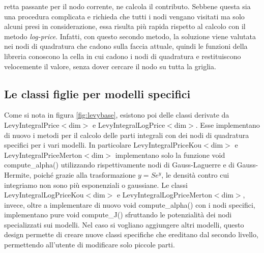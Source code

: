 \documentclass[a4paper,10pt]{report}
\theoremstyle{plain}
\theoremstyle{definition}
\theoremstyle{remark}
\begin{document}
retta passante per il nodo corrente, ne calcola il contributo. Sebbene questa sia una procedura complicata  e richieda che tutti i nodi vengano visitati ma solo alcuni presi in considerazione, essa risulta più rapida rispetto al calcolo con il metodo \emph{log-price}. Infatti, con questo secondo metodo, la soluzione viene valutata nei nodi di quadratura che cadono sulla faccia attuale, quindi le funzioni della libreria conoscono la cella in cui cadono i nodi di quadratura e restituiscono velocemente il valore, senza dover cercare il nodo su tutta la griglia.

\subsection{Le classi figlie per modelli specifici}

Come si nota in figura \ref{fig:levybase}, esistono poi delle classi derivate da \textsf{LevyIntegralPrice$<$dim$>$} e \textsf{LevyIntegralLogPrice$<$dim$>$}. Esse implementano di nuovo i metodi per il calcolo delle parti integrali con dei nodi di quadratura specifici per i vari modelli. In particolare \textsf{LevyIntegralPriceKou$<$dim$>$} e \textsf{LevyIntegralPriceMerton$<$dim$>$} implementano solo la funzione \textsf{void compute\_alpha()} utilizzando rispettivamente nodi di Gauss-Laguerre e di Gauss-Hermite, poich\'e grazie alla trasformazione $y=Se^y$, le densit\`a contro cui integriamo non sono pi\`u esponenziali o gaussiane. Le classi \textsf{LevyIntegralLogPriceKou$<$dim$>$} e {LevyIntegralLogPriceMerton$<$dim$>$}, invece, oltre a implementare di nuovo \textsf{void compute\_alpha()} con i nodi specifici, implementano pure \textsf{void compute\_J()} sfruttando le potenzialit\`a dei nodi specializzati sui modelli. Nel caso si vogliano aggiungere altri modelli, questo design permette di creare nuove classi specifiche che ereditano dal secondo livello, permettendo all'utente di modificare solo piccole parti.
\end{document}
